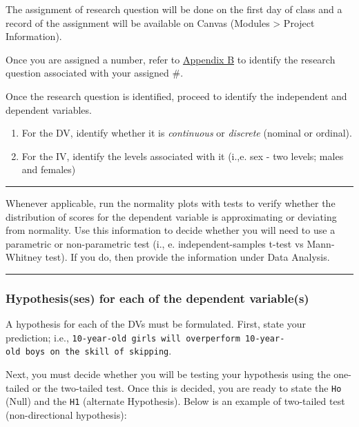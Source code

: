 \documentclass[
]{article}
\begin{document}
The assignment of research question will be done on the first day of class and a record of the assignment will be available on Canvas (Modules \textgreater{} Project Information).

Once you are assigned a number, refer to \protect\hyperlink{appendix-b}{Appendix B} to identify the research question associated with your assigned \#.

Once the research question is identified, proceed to identify the independent and dependent variables.

\begin{enumerate}
\def\labelenumi{\alph{enumi}.}
\item
  For the DV, identify whether it is \emph{continuous} or \emph{discrete} (nominal or ordinal).
\item
  For the IV, identify the levels associated with it (i.,e. sex - two levels; males and females)
\end{enumerate}

\begin{center}\rule{0.5\linewidth}{0.5pt}\end{center}

Whenever applicable, run the normality plots with tests to verify whether the distribution of scores for the dependent variable is approximating or deviating from normality. Use this information to decide whether you will need to use a parametric or non-parametric test (i., e. independent-samples t-test vs Mann-Whitney test). If you do, then provide the information under Data Analysis.

\begin{center}\rule{0.5\linewidth}{0.5pt}\end{center}

\hypertarget{hypothesisses-for-each-of-the-dependent-variables}{%
\subsubsection{Hypothesis(ses) for each of the dependent variable(s)}\label{hypothesisses-for-each-of-the-dependent-variables}}

A hypothesis for each of the DVs must be formulated. First, state your prediction; i.e., \texttt{10-year-old\ girls\ will\ overperform\ 10-year-old\ boys\ on\ the\ skill\ of\ skipping}.

Next, you must decide whether you will be testing your hypothesis using the one-tailed or the two-tailed test. Once this is decided, you are ready to state the \texttt{Ho} (Null) and the \texttt{H1} (alternate Hypothesis). Below is an example of two-tailed test (non-directional hypothesis):
\end{document}
